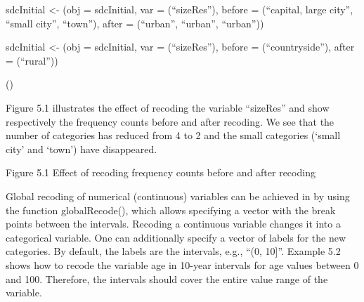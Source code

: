 \documentclass[letterpaper,10pt,english]{sphinxmanual}
\begin{document}
\begin{DUlineblock}{0em}
\item[] 
\item[] sdcInitial \textless{}- (obj = sdcInitial, var =
(“sizeRes”), before = (“capital, large city”, “small
city”, “town”), after = (“urban”, “urban”, “urban”))
\item[] 
\item[] sdcInitial \textless{}- (obj = sdcInitial, var =
(“sizeRes”), before = (“countryside”), after =
(“rural”))
\item[] 
\item[] ()
\end{DUlineblock}

\begin{DUlineblock}{0em}
\item[] 
\item[] 
\end{DUlineblock}

Figure 5.1 illustrates the effect of recoding the variable “sizeRes” and
show respectively the frequency counts before and after recoding. We see
that the number of categories has reduced from 4 to 2 and the small
categories (‘small city’ and ‘town’) have disappeared.

\noindent{}

Figure 5.1 Effect of recoding \textendash{} frequency counts before and after
recoding


Global recoding of numerical (continuous) variables can be achieved in
 by using the function globalRecode(), which allows specifying
a vector with the break points between the intervals. Recoding a
continuous variable changes it into a categorical variable. One can
additionally specify a vector of labels for the new categories. By
default, the labels are the intervals, e.g., “(0, 10{]}”. Example 5.2
shows how to recode the variable age in 10-year intervals for age values
between 0 and 100.  Therefore, the intervals
should cover the entire value range of the variable.
\end{document}
